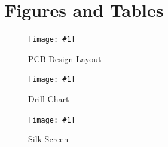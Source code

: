 \documentclass[12pt]{article}
\newcommand{\quickfigure}[4]{%
\begin{figure}[!htbp]
\centering
\texttt{[image: \#1]}
\caption{#3}
\label{#4}
\end{figure}%
}
\begin{document}
\section*{Figures and Tables}
\quickfigure{pcb-design-layout.png}{15cm}{PCB Design Layout}{pcb-design-layout}

\quickfigure{images/drill-chart.png}{15cm}{Drill Chart}{drill-chart}

\quickfigure{images/silk-screen.png}{15cm}{Silk Screen}{silk-screen}
\end{document}
